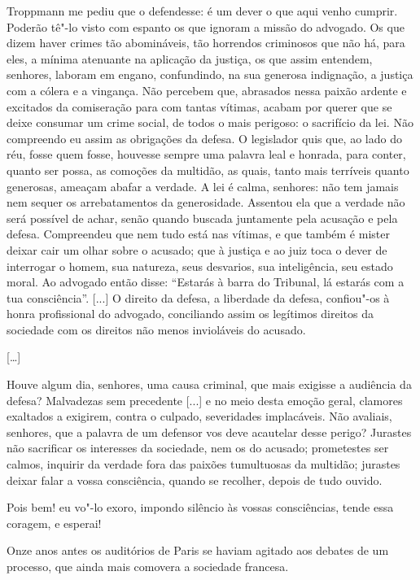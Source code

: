 \begin{hedraquote}
Troppmann me pediu que o
defendesse: é um dever o que aqui venho cumprir. Poderão tê"-lo visto
com espanto os que ignoram a missão do advogado. Os que dizem haver
crimes tão abomináveis, tão horrendos criminosos que não há, para eles,
a mínima atenuante na aplicação da justiça, os que assim entendem,
senhores, laboram em engano, confundindo, na sua generosa indignação, a
justiça com a cólera e a vingança. Não percebem que, abrasados nessa
paixão ardente e excitados da comiseração para com tantas vítimas,
acabam por querer que se deixe consumar um crime social, de todos o
mais perigoso: o sacrifício da lei. Não compreendo eu assim as
obrigações da defesa. O legislador quis que, ao lado do réu, fosse quem
fosse, houvesse sempre uma palavra leal e honrada, para conter, quanto
ser possa, as comoções da multidão, as quais, tanto mais terríveis
quanto generosas, ameaçam abafar a verdade. A lei é calma, senhores:
não tem jamais nem sequer os arrebatamentos da generosidade. Assentou
ela que a verdade não será possível de achar, senão quando buscada
juntamente pela acusação e pela defesa. Compreendeu que nem tudo está
nas vítimas, e que também é mister deixar cair um olhar sobre o
acusado; que à justiça e ao juiz toca o dever de interrogar o homem,
sua natureza, seus desvarios, sua inteligência, seu estado moral. Ao
advogado então disse: “Estarás à barra do Tribunal, lá estarás com a
tua consciência”. [...] O direito da defesa, a liberdade da defesa,
confiou"-os à honra profissional do advogado, conciliando assim os
legítimos direitos da sociedade com os direitos não menos invioláveis
do acusado.

[\ldots{}]

Houve algum dia, senhores, uma causa criminal, que mais exigisse a
audiência da defesa? Malvadezas sem precedente [...] e no meio desta
emoção geral, clamores exaltados a exigirem, contra o culpado,
severidades implacáveis. Não avaliais, senhores, que a palavra de um
defensor vos deve acautelar desse perigo? Jurastes não sacrificar os
interesses da sociedade, nem os do acusado; prometestes ser calmos,
inquirir da verdade fora das paixões tumultuosas da multidão; jurastes
deixar falar a vossa consciência, quando se recolher, depois de tudo
ouvido. 

Pois bem! eu vo"-lo exoro, impondo silêncio às vossas
consciências, tende essa coragem, e esperai! 
\end{hedraquote}

Onze anos antes os auditórios de Paris se haviam agitado 
aos debates de um processo, que ainda mais comovera a sociedade francesa. 

